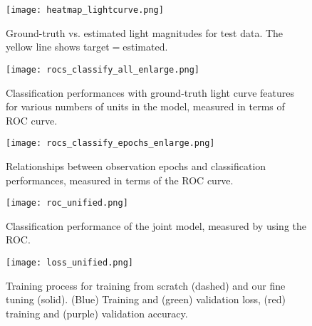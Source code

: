 \documentclass[conference,compsoc]{IEEEtran}
\begin{document}
\begin{figure}[t]
  \begin{center}
    \texttt{[image: heatmap\_lightcurve.png]}
  \end{center}
  \caption{%
    Ground-truth vs. estimated light magnitudes for test data. The yellow line shows target$=$estimated.
  }
  \label{fig:heatmap_lightcurve}
\end{figure}

\begin{figure}[t]
  \begin{center}
    \texttt{[image: rocs\_classify\_all\_enlarge.png]}
  \end{center}
  \caption{%
    Classification performances with ground-truth light curve features for various numbers of units in the model, measured in terms of ROC curve.
  }
  \label{fig:roc_classify}
\end{figure}

\begin{figure}[t]
  \begin{center}
    \texttt{[image: rocs\_classify\_epochs\_enlarge.png]}
  \end{center}
  \caption{%
    Relationships between observation epochs and classification performances, measured in terms of the ROC curve.
  }
  \label{fig:roc_classify_epoch}
\end{figure}




\begin{figure}[t]
  \begin{center}
    \texttt{[image: roc\_unified.png]}
  \end{center}
  \caption{%
    Classification performance of the joint model, measured by using the ROC.
  }
  \label{fig:roc_unified}
\end{figure}

\begin{figure}[t]
  \begin{center}
    \texttt{[image: loss\_unified.png]}
    \end{center}
  \caption{%
    Training process for training from scratch (dashed) and our fine tuning (solid).
    (Blue) Training and (green) validation loss, (red) training and (purple) validation accuracy.
  }
  \label{fig:loss_unified}
\end{figure}
\end{document}
